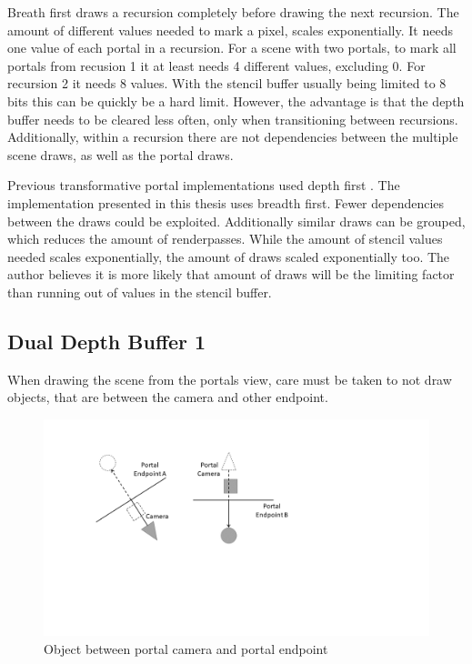 Breath first draws a recursion completely before drawing the next recursion. The amount of different values needed to mark a pixel, scales exponentially. It needs one value of each portal in a recursion. For a scene with two portals, to mark all portals from recusion 1 it at least needs 4 different values, excluding 0. For recursion 2 it needs 8 values. With the stencil buffer usually being limited to 8 bits this can be quickly be a hard limit. However, the advantage is that the depth buffer needs to be cleared less often, only when transitioning between recursions. Additionally, within a recursion there are not dependencies between the multiple scene draws, as well as the portal draws.

Previous transformative portal implementations used depth first \cite{lowe:2005:technique,lecture:portalProblems}. The implementation presented in this thesis uses breadth first. Fewer dependencies between the draws could be exploited. Additionally similar draws can be grouped, which reduces the amount of renderpasses. While the amount of stencil values needed scales exponentially, the amount of draws scaled exponentially too. The author believes it is more likely that amount of draws will be the limiting factor than running out of values in the stencil buffer.

\subsection{Dual Depth Buffer 1}

When drawing the scene from the portals view, care must be taken to not draw objects, that are between the camera and other endpoint.
\begin{figure}[h]
	\includegraphics[width=\linewidth]{images/bananajuce.png}
	\caption{Object between portal camera and portal endpoint}
	\label{fig:bananajuce}
\end{figure}

